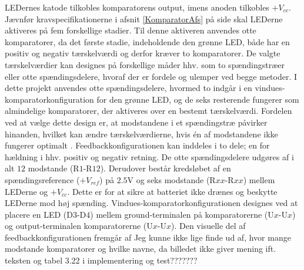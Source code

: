 LEDernes katode tilkobles komparatorens output, imens anoden tilkobles $+V_{cc}$. Jævnfør kravspecifikationerne i afsnit \ref{KomparatorAfs} på side \pageref{KomparatorAfs} skal LEDerne aktiveres på fem forskellige stadier. Til denne aktiveren anvendes otte komparatorer, da det første stadie, indeholdende den grønne LED, både har en positiv og negativ tærskelværdi og derfor kræver to komparatorer. De valgte tærskelværdier kan designes på forskellige måder hhv. som to spændingstræer eller otte spændingsdelere, hvoraf der er fordele og ulemper ved begge metoder. I dette projekt anvendes otte spændingsdelere, hvormed to indgår i en vindues-komparatorkonfiguration for den grønne LED, og de seks resterende fungerer som almindelige komparatorer, der aktiveres over en bestemt tærskelværdi. Fordelen ved at vælge dette design er, at modstandene i et spændingstræ påvirker hinanden, hvilket kan ændre tærskelværdierne, hvis én af modstandene ikke fungerer optimalt . Feedbackkonfigurationen kan inddeles i to dele; en for hældning i hhv. positiv og negativ retning. De otte spændingsdelere udgøres af i alt $12$ modstande (R$1$-R$12$). Derudover består kredsløbet af en spændingsreference ($+V_{ref}$) på $2.5$V og seks modstande (R$xx$-R$xx$) mellem LEDerne og $+V_{cc}$. Dette er for at sikre at batteriet ikke drænes og beskytte LEDerne mod høj spænding. Vindues-komparatorkonfigurationen designes ved at placere en LED (D$3$-D$4$) mellem ground-terminalen på komparatorerne (U$x$-U$x$) og output-terminalen komparatorerne (U$x$-U$x$).  Den visuelle del af feedbackkonfigurationen fremgår af  {\color{red} Jeg kunne ikke lige finde ud af, hvor mange modstande komparatorer og hvilke navne, da billedet ikke giver mening ift. teksten og tabel 3.22 i implementering og test???????} 

